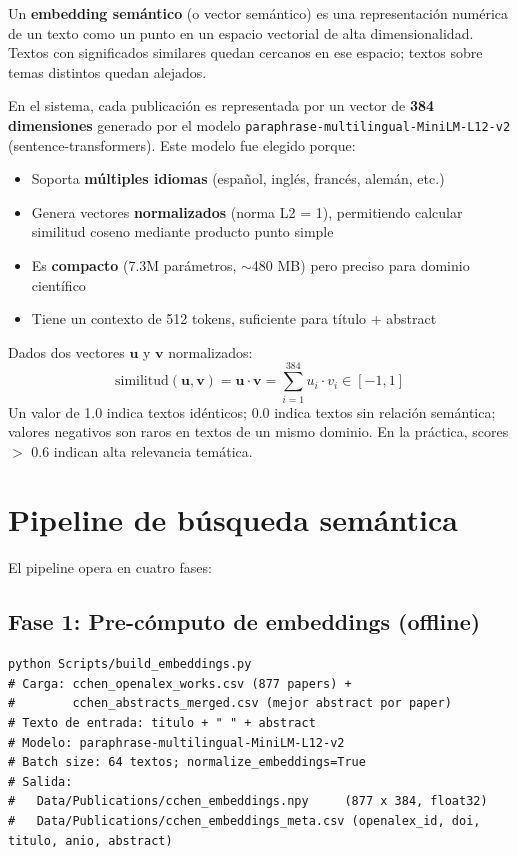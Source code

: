 \documentclass[12pt,a4paper]{report}
\begin{document}
Un \textbf{embedding semántico} (o vector semántico) es una representación numérica de un texto como un punto en un espacio vectorial de alta dimensionalidad. Textos con significados similares quedan cercanos en ese espacio; textos sobre temas distintos quedan alejados.

En el sistema, cada publicación es representada por un vector de \textbf{384 dimensiones} generado por el modelo \texttt{paraphrase-multilingual-MiniLM-L12-v2} (sentence-transformers). Este modelo fue elegido porque:
\begin{itemize}
  \item Soporta \textbf{múltiples idiomas} (español, inglés, francés, alemán, etc.)
  \item Genera vectores \textbf{normalizados} (norma L2 = 1), permitiendo calcular similitud coseno mediante producto punto simple
  \item Es \textbf{compacto} (7.3M parámetros, $\sim$480 MB) pero preciso para dominio científico
  \item Tiene un contexto de 512 tokens, suficiente para título + abstract
\end{itemize}

\begin{infobox}
Dados dos vectores $\mathbf{u}$ y $\mathbf{v}$ normalizados:
\[ \text{similitud}(\mathbf{u}, \mathbf{v}) = \mathbf{u} \cdot \mathbf{v} = \sum_{i=1}^{384} u_i \cdot v_i \in [-1, 1] \]
Un valor de 1.0 indica textos idénticos; 0.0 indica textos sin relación semántica; valores negativos son raros en textos de un mismo dominio. En la práctica, scores $>$ 0.6 indican alta relevancia temática.
\end{infobox}

\section{Pipeline de búsqueda semántica}

El pipeline opera en cuatro fases:

\subsection*{Fase 1: Pre-cómputo de embeddings (offline)}

\begin{lstlisting}[style=bashstyle, caption={Generación de embeddings (Scripts/build\_embeddings.py)}]
python Scripts/build_embeddings.py
# Carga: cchen_openalex_works.csv (877 papers) +
#        cchen_abstracts_merged.csv (mejor abstract por paper)
# Texto de entrada: titulo + " " + abstract
# Modelo: paraphrase-multilingual-MiniLM-L12-v2
# Batch size: 64 textos; normalize_embeddings=True
# Salida:
#   Data/Publications/cchen_embeddings.npy     (877 x 384, float32)
#   Data/Publications/cchen_embeddings_meta.csv (openalex_id, doi, titulo, anio, abstract)
\end{lstlisting}
\end{document}
